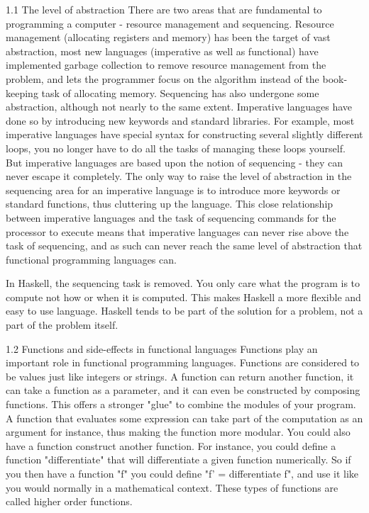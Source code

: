 \documentclass{report}
\begin{document}
1.1 The level of abstraction
There are two areas that are fundamental to programming a computer - resource management and sequencing. Resource management (allocating registers and memory) has been the target of vast abstraction, most new languages (imperative as well as functional) have implemented garbage collection to remove resource management from the problem, and lets the programmer focus on the algorithm instead of the book-keeping task of allocating memory. Sequencing has also undergone some abstraction, although not nearly to the same extent. Imperative languages have done so by introducing new keywords and standard libraries. For example, most imperative languages have special syntax for constructing several slightly different loops, you no longer have to do all the tasks of managing these loops yourself. But imperative languages are based upon the notion of sequencing - they can never escape it completely. The only way to raise the level of abstraction in the sequencing area for an imperative language is to introduce more keywords or standard functions, thus cluttering up the language. This close relationship between imperative languages and the task of sequencing commands for the processor to execute means that imperative languages can never rise above the task of sequencing, and as such can never reach the same level of abstraction that functional programming languages can.

In Haskell, the sequencing task is removed. You only care what the program is to compute not how or when it is computed. This makes Haskell a more flexible and easy to use language. Haskell tends to be part of the solution for a problem, not a part of the problem itself.

1.2 Functions and side-effects in functional languages
Functions play an important role in functional programming languages. Functions are considered to be values just like integers or strings. A function can return another function, it can take a function as a parameter, and it can even be constructed by composing functions. This offers a stronger "glue" to combine the modules of your program. A function that evaluates some expression can take part of the computation as an argument for instance, thus making the function more modular. You could also have a function construct another function. For instance, you could define a function "differentiate" that will differentiate a given function numerically. So if you then have a function "f" you could define "f' = differentiate f", and use it like you would normally in a mathematical context. These types of functions are called higher order functions.
\end{document}
